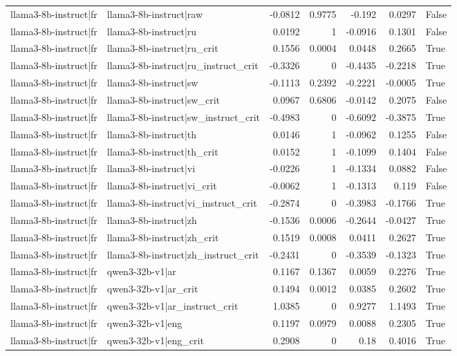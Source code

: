 \begin{table}
\begin{tabular}{l l r r r r l}
llama3-8b-instruct|fr & llama3-8b-instruct|raw & -0.0812 & 0.9775 & -0.192 & 0.0297 & False \\
llama3-8b-instruct|fr & llama3-8b-instruct|ru & 0.0192 & 1 & -0.0916 & 0.1301 & False \\
llama3-8b-instruct|fr & llama3-8b-instruct|ru_crit & 0.1556 & 0.0004 & 0.0448 & 0.2665 & True \\
llama3-8b-instruct|fr & llama3-8b-instruct|ru_instruct_crit & -0.3326 & 0 & -0.4435 & -0.2218 & True \\
llama3-8b-instruct|fr & llama3-8b-instruct|sw & -0.1113 & 0.2392 & -0.2221 & -0.0005 & True \\
llama3-8b-instruct|fr & llama3-8b-instruct|sw_crit & 0.0967 & 0.6806 & -0.0142 & 0.2075 & False \\
llama3-8b-instruct|fr & llama3-8b-instruct|sw_instruct_crit & -0.4983 & 0 & -0.6092 & -0.3875 & True \\
llama3-8b-instruct|fr & llama3-8b-instruct|th & 0.0146 & 1 & -0.0962 & 0.1255 & False \\
llama3-8b-instruct|fr & llama3-8b-instruct|th_crit & 0.0152 & 1 & -0.1099 & 0.1404 & False \\
llama3-8b-instruct|fr & llama3-8b-instruct|vi & -0.0226 & 1 & -0.1334 & 0.0882 & False \\
llama3-8b-instruct|fr & llama3-8b-instruct|vi_crit & -0.0062 & 1 & -0.1313 & 0.119 & False \\
llama3-8b-instruct|fr & llama3-8b-instruct|vi_instruct_crit & -0.2874 & 0 & -0.3983 & -0.1766 & True \\
llama3-8b-instruct|fr & llama3-8b-instruct|zh & -0.1536 & 0.0006 & -0.2644 & -0.0427 & True \\
llama3-8b-instruct|fr & llama3-8b-instruct|zh_crit & 0.1519 & 0.0008 & 0.0411 & 0.2627 & True \\
llama3-8b-instruct|fr & llama3-8b-instruct|zh_instruct_crit & -0.2431 & 0 & -0.3539 & -0.1323 & True \\
llama3-8b-instruct|fr & qwen3-32b-v1|ar & 0.1167 & 0.1367 & 0.0059 & 0.2276 & True \\
llama3-8b-instruct|fr & qwen3-32b-v1|ar_crit & 0.1494 & 0.0012 & 0.0385 & 0.2602 & True \\
llama3-8b-instruct|fr & qwen3-32b-v1|ar_instruct_crit & 1.0385 & 0 & 0.9277 & 1.1493 & True \\
llama3-8b-instruct|fr & qwen3-32b-v1|eng & 0.1197 & 0.0979 & 0.0088 & 0.2305 & True \\
llama3-8b-instruct|fr & qwen3-32b-v1|eng_crit & 0.2908 & 0 & 0.18 & 0.4016 & True \\

\end{tabular}
\end{table}
